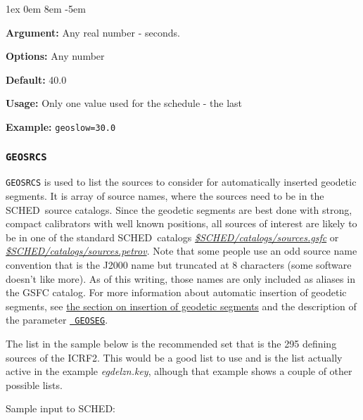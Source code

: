\documentclass{report}
\newcommand{\sched}{{\sc SCHED}}
\newcommand{\schedb}{{\sc SCHED~}}
\newcommand{\rcwbox}[5]{
  \begin{list}{}{\parsep 1ex  \itemsep 0em
                 \leftmargin 8em  \itemindent -5em }
    \item {\bf Argument:} #1
    \item {\bf Options:}  #2
    \item {\bf Default:}  #3
    \item {\bf Usage:}    #4
    \item {\bf Example:}  #5
  \end{list}
}
\begin{document}
\rcwbox
{Any real number - seconds.}
{Any number}
{40.0}
{Only one value used for the schedule - the last}
{{\tt geoslow=30.0}}

\subsubsection{\label{MP:GEOSRCS}{\tt GEOSRCS}}

{\tt GEOSRCS} is used to list the sources to consider for
automatically inserted geodetic segments.  It is array of source
names, where the sources need to be in the \schedb source catalogs.
Since the geodetic segments are best done with strong, compact
calibrators with well known positions, all sources of interest are
likely to be in one of the standard \schedb catalogs
{\href{catalogs/sources.gsfc}{{\sl \$SCHED/catalogs/sources.gsfc}}} or
{\href{catalogs/sources.petrov}{{\sl
\$SCHED/catalogs/sources.petrov}}}.  Note that some people use an odd
source name convention that is the J2000 name but truncated at 8
characters (some software doesn't like more).  As of this writing,
those names are only included as aliases in the GSFC catalog.  For
more information about automatic insertion of geodetic segments, see
{\hyperref[SEC:GEOSEG]{the section on insertion of geodetic segments}}
and the description of the parameter {\hyperref[MP:GEOSEG]{{\tt
GEOSEG}}}.

The list in the sample below is the recommended set that is the 
295 defining sources of the ICRF2.  This would be a good list to use
and is the list actually active in the example {\sl egdelzn.key}, alhough
that example shows a couple of other possible lists.

Sample input to \sched:
\end{document}
